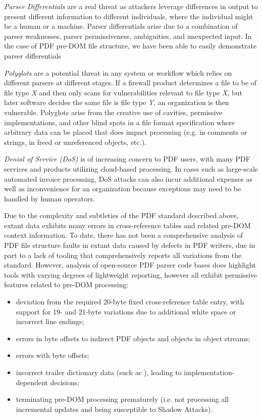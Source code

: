 \emph{Parser Differentials} are a real threat as attackers leverage
differences in output to present different information to different
individuals, where the individual might be a human or a
machine. Parser differentials arise due to a combination of parser
weaknesses, parser permissiveness, ambiguities, and unexpected
input. In the case of PDF pre-DOM file structure, we have been able to
easily demonstrate parser differentials 

\emph{Polyglots} are a potential threat in any system or workflow
which relies on different parsers at different stages. If a firewall
product determines a file to be of file type \emph{X} and then only
scans for vulnerabilities relevant to file type \emph{X}, but later
software decides the same file is file type \emph{Y}, an organization
is then vulnerable.  Polyglots arise from the creative use of
cavities, permissive implementations, and other blind spots in a file
format specification where arbitrary data can be placed that does
impact processing (e.g. in comments or strings, in freed or
unreferenced objects, etc.).

\emph{Denial of Service (DoS)} is of increasing concern to PDF users,
with many PDF services and products utilizing cloud-based processing.
%
In cases such as large-scale automated invoice processing, DoS attacks
can also incur additional expenses as well as inconvenience for an
organization because exceptions may need to be handled by human
operators.

Due to the complexity and subtleties of the PDF standard described
above, extant data exhibits many errors in cross-reference tables and
related pre-DOM context information.
%
To date, there has not been a comprehensive analysis of PDF file
structure faults in extant data caused by defects in PDF writers, due
in part to a lack of tooling that comprehensively reports all
variations from the standard.
%
However, analysis of open-source PDF parser code bases does highlight
tools with varying degrees of lightweight reporting, however all
exhibit permissive features related to pre-DOM processing:
%
\begin{itemize}
    \item deviation from the required 20-byte fixed cross-reference table entry, with support for
    19- and 21-byte variations due to additional white space or incorrect line endings;
    \item errors in byte offsets to indirect PDF objects and objects in object streams;
    \item errors with  byte offsets;
    \item incorrect trailer dictionary data (such as ), leading to implementation-dependent decisions;  
    \item terminating pre-DOM processing prematurely (i.e. not processing all incremental updates and  
    being susceptible to Shadow Attacks).
\end{itemize}
